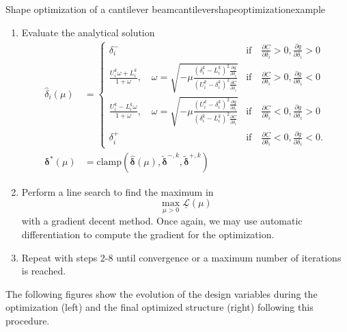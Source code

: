 \begin{example}{Shape optimization of a cantilever beam}{cantilevershapeoptimizationexample}
\begin{enumerate}
        \item Evaluate the analytical solution
            \begin{align}
                \hat{\delta}_i(\mu) &= 
                \begin{cases}
                    \delta^-_i 
                        &\textrm{if} \quad \frac{\partial C}{\partial \delta_i} > 0, \frac{\partial g}{\partial \delta_i} > 0 \\
                    \frac{U_i^k\omega + L_i^k}{1+\omega}, \quad \omega = \sqrt{-\mu\frac{(\delta_i^k-L_i^k)^2\frac{\partial g}{\partial \delta_i}}{(U_i^k-\delta_i^k)^2\frac{\partial C}{\partial \delta_i}}}
                        &\textrm{if} \quad \frac{\partial C}{\partial \delta_i}  > 0, \frac{\partial g}{\partial \delta_i} <0\\
                    \frac{U_i^k-L_i^k\omega}{1+\omega}, \quad \omega = \sqrt{-\mu\frac{(U_i^k-\delta_i^k)^2\frac{\partial g}{\partial \delta_i}}{(\delta_i^k-L_i^k)^2\frac{\partial C}{\partial \delta_i}}} 
                        &\textrm{if} \quad \frac{\partial C}{\partial \delta_i} < 0, \frac{\partial g}{\partial \delta_i}  > 0\\
                    \delta^+_i 
                        &\textrm{if} \quad \frac{\partial C}{\partial \delta_i}< 0, \frac{\partial g}{\partial \delta_i} < 0.
                \end{cases} \\
                \pmb{\delta}^* (\mu) &= \textrm{clamp}\left(\hat{\pmb{\delta}}(\mu), \tilde{\pmb{\delta}}^{-,k}, \tilde{\pmb{\delta}}^{+,k}\right)
            \end{align}
        \item Perform a line search to find the maximum in 
            \begin{equation}
                \max_{\mu>0} \underline{\mathcal{L}}(\mu)
            \end{equation}
            with a gradient decent method. Once again, we may use automatic differentiation to compute the gradient for the optimization.
        \item Repeat with steps 2-8 until convergence or a maximum number of iterations is reached.
    \end{enumerate}
    
    The following figures show the evolution of the design variables during the optimization (left) and the final optimized structure (right) following this procedure. 

    \begin{minipage}{.5\textwidth}
        \centering
        
    \end{minipage}%
    \begin{minipage}{.5\textwidth}
        \centering
        
    \end{minipage}
       
\end{example}



 